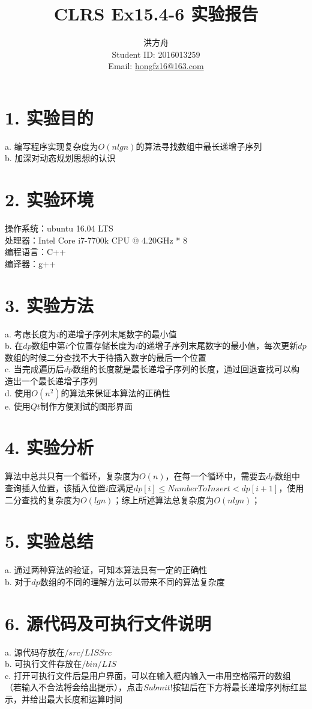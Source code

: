 \documentclass[12pt]{article}
\title{CLRS Ex15.4-6 实验报告}
\author{洪方舟\\Student ID: 2016013259\\Email: \href{mailto:hongfz16@163.com}{hongfz16@163.com}}
\begin{document}
  \maketitle
  \section*{1. 实验目的}
  a. 编写程序实现复杂度为$O(nlgn)$的算法寻找数组中最长递增子序列\\
  b. 加深对动态规划思想的认识
  \section*{2. 实验环境}
  操作系统：ubuntu 16.04 LTS\\
  处理器：Intel Core i7-7700k CPU @ 4.20GHz * 8\\
  编程语言：C++\\
  编译器：g++
  \section*{3. 实验方法}
  a. 考虑长度为$i$的递增子序列末尾数字的最小值\\
  b. 在$dp$数组中第$i$个位置存储长度为$i$的递增子序列末尾数字的最小值，每次更新$dp$数组的时候二分查找不大于待插入数字的最后一个位置\\
  c. 当完成遍历后$dp$数组的长度就是最长递增子序列的长度，通过回退查找可以构造出一个最长递增子序列\\
  d. 使用$O(n^2)$的算法来保证本算法的正确性\\
  e. 使用$Qt$制作方便测试的图形界面
  \section*{4. 实验分析}
  算法中总共只有一个循环，复杂度为$O(n)$，在每一个循环中，需要去$dp$数组中查询插入位置，该插入位置$i$应满足$dp[i]\leq NumberToInsert<dp[i+1]$，使用二分查找的复杂度为$O(lgn)$；综上所述算法总复杂度为$O(nlgn)$；
  \section*{5. 实验总结}
  a. 通过两种算法的验证，可知本算法具有一定的正确性\\
  b. 对于$dp$数组的不同的理解方法可以带来不同的算法复杂度
  \section*{6. 源代码及可执行文件说明}
  a. 源代码存放在$/src/LISSrc$\\
  b. 可执行文件存放在$/bin/LIS$\\
  c. 打开可执行文件后是用户界面，可以在输入框内输入一串用空格隔开的数组（若输入不合法将会给出提示），点击$Submit!$按钮后在下方将最长递增序列标红显示，并给出最大长度和运算时间
\end{document}
